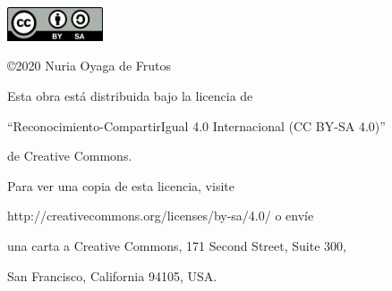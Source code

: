 \begin{flushright}

\includegraphics[height=1.0cm]{figures/CC-BY-SA.png}

\vspace*{0.5cm}

\copyright 2020 Nuria Oyaga de Frutos

\vspace*{0.3cm}

Esta obra está distribuida bajo la licencia de 

``Reconocimiento-CompartirIgual 4.0 Internacional (CC BY-SA 4.0)''

de Creative Commons.

\vspace{0.2cm}

Para ver una copia de esta licencia, visite

http://creativecommons.org/licenses/by-sa/4.0/ o envíe

una carta a Creative Commons, 171 Second Street, Suite 300,

San Francisco, California 94105, USA.

\end{flushright}